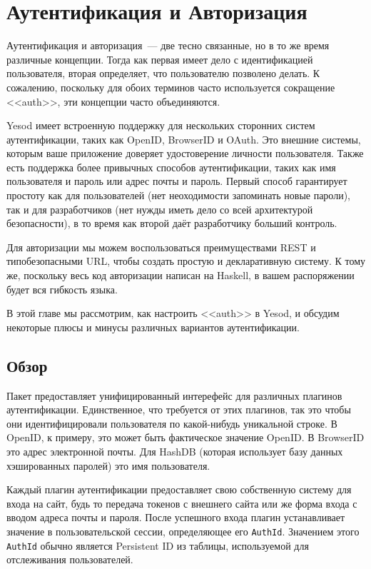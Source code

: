 \chapter{Аутентификация и Авторизация}\label{chap:auth}

Аутентификация и авторизация~--- две тесно связанные, но в то же время различные концепции. Тогда как первая имеет дело с идентификацией пользователя, вторая определяет, что пользователю позволено делать. К сожалению, поскольку для обоих терминов часто используется сокращение <<auth>>, эти концепции часто объединяются.

Yesod имеет встроенную поддержку для нескольких сторонних систем аутентификации, таких как OpenID, BrowserID и OAuth. Это внешние системы, которым ваше приложение доверяет удостоверение личности пользователя. Также есть поддержка более привычных способов аутентификации, таких как имя пользователя и пароль или адрес почты и пароль. Первый способ гарантирует простоту как для пользователей (нет неоходимости запоминать новые пароли), так и для разработчиков (нет нужды иметь дело со всей архитектурой безопасности), в то время как второй даёт разработчику больший контроль.

Для авторизации мы можем воспользоваться преимуществами REST и типобезопасными URL, чтобы создать простую и декларативную систему. К тому же, поскольку весь код авторизации написан на Haskell, в вашем распоряжении будет вся гибкость языка.

В этой главе мы рассмотрим, как настроить <<auth>> в Yesod, и обсудим некоторые плюсы и минусы различных вариантов аутентификации.

\section{Обзор}


Пакет  предоставляет унифицированный интерефейс для различных плагинов аутентификации. Единственное, что требуется от этих плагинов, так это чтобы они идентифицировали пользователя по какой-нибудь уникальной строке. В OpenID, к примеру, это может быть фактическое значение OpenID. В BrowserID это адрес электронной почты. Для HashDB (которая использует базу данных хэшированных паролей) это имя пользователя.

Каждый плагин аутентификации предоставляет свою собственную систему для входа на сайт, будь то передача токенов с внешнего сайта или же форма входа с вводом адреса почты и пароля. После успешного входа плагин устанавливает значение в пользовательской сессии, определяющее его \lstinline'AuthId'. Значением этого \lstinline'AuthId' обычно является Persistent ID из таблицы, используемой для отслеживания пользователей. 

